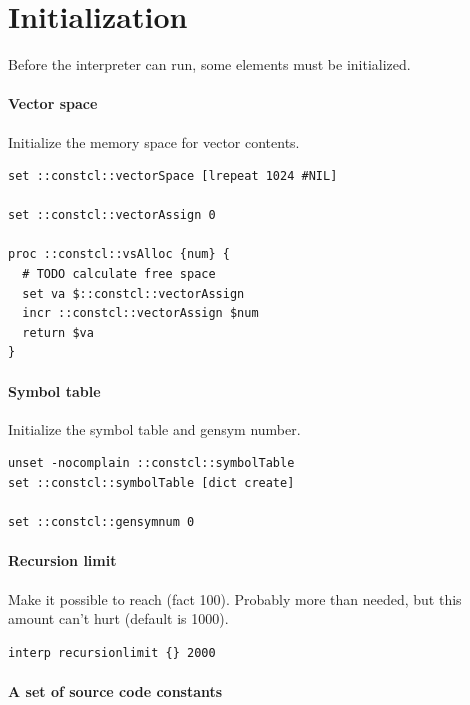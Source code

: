 \documentclass[twoside]{report}
\begin{document}
\chapter{Initialization}
\label{initialization}

Before the interpreter can run, some elements must be initialized.

\subsubsection{Vector space}
\label{vector-space}

Initialize the memory space for vector contents.

\begin{lstlisting}
set ::constcl::vectorSpace [lrepeat 1024 #NIL]

set ::constcl::vectorAssign 0

proc ::constcl::vsAlloc {num} {
  # TODO calculate free space
  set va $::constcl::vectorAssign
  incr ::constcl::vectorAssign $num
  return $va
}
\end{lstlisting}

\subsubsection{Symbol table}
\label{symbol-table}

Initialize the symbol table and gensym number.

\begin{lstlisting}
unset -nocomplain ::constcl::symbolTable
set ::constcl::symbolTable [dict create]

set ::constcl::gensymnum 0
\end{lstlisting}

\subsubsection{Recursion limit}
\label{recursion-limit}

Make it possible to reach (fact 100). Probably more than needed, but this amount can't hurt (default is 1000).

\begin{lstlisting}
interp recursionlimit {} 2000
\end{lstlisting}

\subsubsection{A set of source code constants}
\label{a-set-of-source-code-constants}
\end{document}
